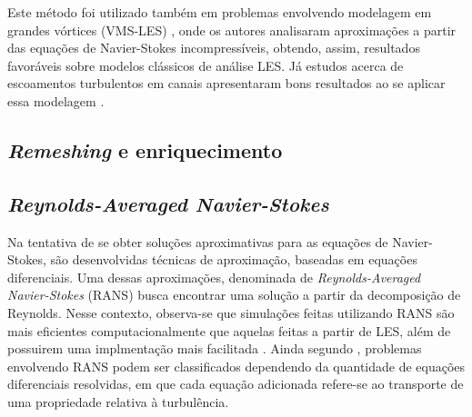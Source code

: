 \documentclass[_ArquivoPrincipal.tex]{subfiles}
\begin{document}
Este método foi utilizado também em problemas envolvendo modelagem em grandes vórtices (VMS-LES) \cite{hughes2000large, bazilevs2007variational}, onde os autores analisaram aproximações a partir das equações de Navier-Stokes incompressíveis, obtendo, assim, resultados favoráveis sobre modelos clássicos de análise LES. Já estudos acerca de escoamentos turbulentos em canais apresentaram bons resultados ao se aplicar essa modelagem \cite{hughes2002variational}.

\subsection{\textit{Remeshing} e enriquecimento} \label{ReE}

\subsection{\textit{Reynolds-Averaged Navier-Stokes}} \label{RANS}

Na tentativa de se obter soluções aproximativas para as equações de Navier-Stokes, são desenvolvidas técnicas de aproximação, baseadas em equações diferenciais. Uma dessas aproximações, denominada de \textit{Reynolds-Averaged Navier-Stokes} (RANS) busca encontrar uma solução a partir da decomposição de Reynolds. Nesse contexto, observa-se que simulações feitas utilizando RANS são mais eficientes computacionalmente que aquelas feitas a partir de LES, além de possuirem uma implmentação mais facilitada \cite{alfonsi2009reynolds, ling2015evaluation}. Ainda segundo , problemas envolvendo RANS podem ser classificados dependendo da quantidade de equações diferenciais resolvidas, em que cada equação adicionada refere-se ao transporte de uma propriedade relativa à turbulência.
\end{document}
